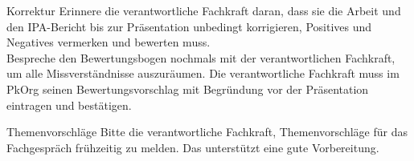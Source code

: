 \begin{taskitem}{Korrektur}
  Erinnere die verantwortliche Fachkraft daran, dass sie die Arbeit und den IPA-Bericht bis zur Präsentation unbedingt korrigieren, Positives und Negatives vermerken und bewerten muss.\\ Bespreche den Bewertungsbogen nochmals mit der verantwortlichen Fachkraft, um alle Missverständnisse auszuräumen. Die verantwortliche Fachkraft muss im PkOrg seinen Bewertungsvorschlag mit Begründung vor der Präsentation eintragen und bestätigen.
\end{taskitem}
\begin{taskitem}{Themenvorschläge}
  Bitte die verantwortliche Fachkraft, Themenvorschläge für das Fachgespräch frühzeitig zu melden. Das unterstützt eine gute Vorbereitung.
\end{taskitem}